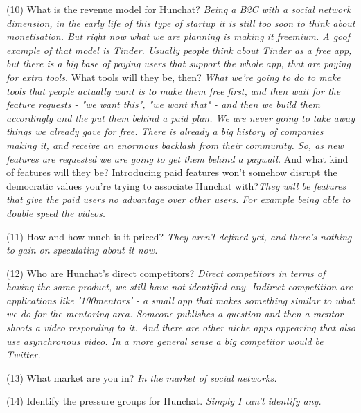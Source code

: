\documentclass[12pt]{article}
\begin{document}
(10) What is the revenue model for Hunchat? \textit{Being a B2C with a social network dimension, in the early life of this type of startup it is still too soon to think about monetisation. But right now what we are planning is making it freemium. A goof example of that model is Tinder. Usually people think about Tinder as a free app, but there is a big base of paying users that support the whole app, that are paying for extra tools. } What tools will they be, then? \textit{What we're going to do to make tools that people actually want is to make them free first, and then wait for the feature requests - "we want this", "we want that" -  and then we build them accordingly and the put them behind a paid plan. We are never going to take away things we already gave for free. There is already a big history of companies making it, and receive an enormous backlash from their community. So, as new features are requested we are going to get them behind a paywall.} And what kind of features will they be? Introducing paid features won't somehow disrupt  the democratic values you're trying to associate Hunchat with?\textit{They will be features that give the paid users no advantage over other users. For example being able to double speed the videos.}

(11) How and how much is it priced? \textit{They aren't defined yet, and there's nothing to gain on speculating about it now.}

(12) Who are Hunchat’s direct competitors? \textit{Direct competitors in terms of having the same product, we still have not identified any. Indirect competition are applications like '100mentors' - a small app that makes something similar to what we do for the mentoring area. Someone publishes a question and then a mentor shoots a video responding to it. And there are other niche apps appearing that also use asynchronous video. In a more general sense a big competitor would be Twitter. }

(13) What market are you in? \textit{In the market of social networks.}

(14) Identify the pressure groups for Hunchat. \textit{Simply I can't identify any.} 
\end{document}
